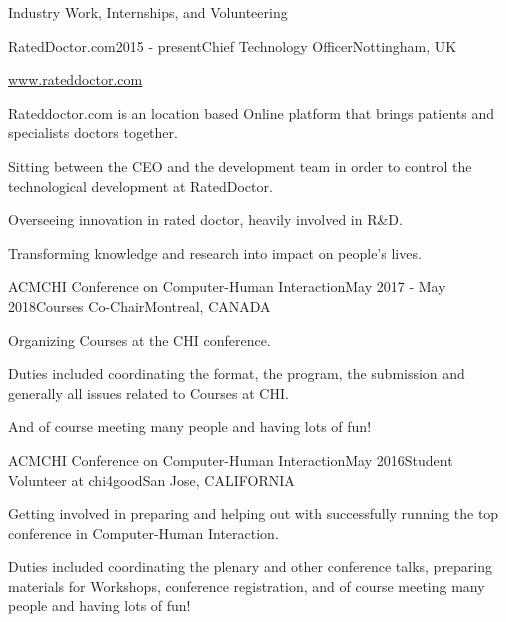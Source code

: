 \documentclass{resume} %
\begin{document}


\begin{rSection}{Industry Work, Internships, and Volunteering}
    \begin{rSubsection}{RatedDoctor.com}{2015 - present}{Chief Technology Officer}{Nottingham, UK}
        \item \url{www.rateddoctor.com}
        \item Rateddoctor.com is an location based Online platform that brings patients and specialists doctors together.
		\item Sitting between the CEO and the development team in order to control the technological development at RatedDoctor.
		\item Overseeing innovation in rated doctor, heavily involved in R\&D.
		\item Transforming knowledge and research into impact on people's lives.
    \end{rSubsection}

	\begin{rSubsection}{ACMCHI Conference on Computer-Human Interaction}{May 2017 - May 2018}{Courses Co-Chair}{Montreal, CANADA}
	\item Organizing Courses at the CHI conference.
	\item Duties included coordinating the format, the program, the submission and generally all issues related to Courses at CHI.
	\item And of course meeting many people and having lots of fun!
\end{rSubsection}

\begin{rSubsection}{ACMCHI Conference on Computer-Human Interaction}{May 2016}{Student Volunteer at chi4good}{San Jose, CALIFORNIA}
	\item Getting involved in preparing and helping out with successfully running the top conference in Computer-Human Interaction. 
	\item Duties included coordinating the plenary and other conference talks, preparing materials for Workshops, conference registration, and of course meeting many people and having lots of fun!
\end{rSubsection}


\end{rSection}
\end{document}
